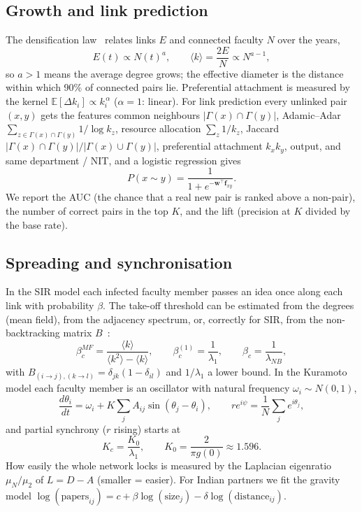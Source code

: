 \documentclass[10pt,twocolumn,a4paper]{article}
\begin{document}
\subsection{Growth and link prediction}
The densification law~\cite{leskovec2005} relates links $E$ and connected faculty $N$ over the years,
\begin{equation}\label{eq:dens}
E(t)\propto N(t)^{a},\qquad \langle k\rangle=\frac{2E}{N}\propto N^{a-1},
\end{equation}
so $a>1$ means the average degree grows; the effective diameter is the distance within which 90\% of connected pairs lie. Preferential attachment is
measured by the kernel $\mathbb{E}[\Delta k_i]\propto k_i^{\,\alpha}$ ($\alpha=1$: linear). For link prediction every unlinked pair $(x,y)$ gets
the features common neighbours $|\Gamma(x)\cap\Gamma(y)|$, Adamic--Adar $\sum_{z\in\Gamma(x)\cap\Gamma(y)}1/\log k_z$, resource allocation
$\sum_z 1/k_z$, Jaccard $|\Gamma(x)\cap\Gamma(y)|/|\Gamma(x)\cup\Gamma(y)|$, preferential attachment $k_xk_y$, output, and same department / NIT,
and a logistic regression gives
\begin{equation}\label{eq:logit}
P(x\sim y)=\frac{1}{1+e^{-\mathbf{w}^{\top}\mathbf{f}_{xy}}}.
\end{equation}
We report the AUC (the chance that a real new pair is ranked above a non-pair), the number of correct pairs in the top $K$, and the lift
(precision at $K$ divided by the base rate).

\subsection{Spreading and synchronisation}
In the SIR model each infected faculty member passes an idea once along each link with probability $\beta$. The take-off threshold can be estimated
from the degrees (mean field), from the adjacency spectrum, or, correctly for SIR, from the non-backtracking matrix $B$~\cite{karrer2014}:
\begin{equation}\label{eq:sir}
\beta_c^{MF}=\frac{\langle k\rangle}{\langle k^2\rangle-\langle k\rangle},\qquad
\beta_c^{(1)}=\frac{1}{\lambda_1},\qquad \beta_c=\frac{1}{\lambda_{NB}},
\end{equation}
with $B_{(i\to j),(k\to l)}=\delta_{jk}(1-\delta_{il})$ and $1/\lambda_1$ a lower bound. In the Kuramoto model each faculty member is an
oscillator with natural frequency $\omega_i\sim N(0,1)$,
\begin{equation}\label{eq:kur}
\frac{d\theta_i}{dt}=\omega_i+K\sum_jA_{ij}\sin(\theta_j-\theta_i),\qquad re^{i\psi}=\frac{1}{N}\sum_je^{i\theta_j},
\end{equation}
and partial synchrony ($r$ rising) starts at~\cite{restrepo2005}
\begin{equation}\label{eq:kc}
K_c=\frac{K_0}{\lambda_1},\qquad K_0=\frac{2}{\pi g(0)}\approx1.596 .
\end{equation}
How easily the whole network locks is measured by the Laplacian eigenratio $\mu_N/\mu_2$ of $L=D-A$ (smaller = easier). For Indian partners
we fit the gravity model $\log(\text{papers}_{ij})=c+\beta\log(\text{size}_j)-\delta\log(\text{distance}_{ij})$.
\end{document}
